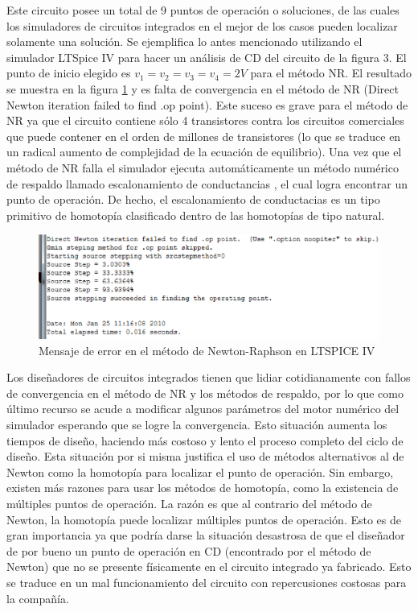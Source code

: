 \documentclass[conference,letterpaper,onecolumn]{IEEEtran}
\begin{document}
Este circuito posee un total de 9 puntos de operaci\'on o soluciones, de las cuales los simuladores de circuitos integrados en el mejor de los casos pueden localizar solamente una soluci\'on. Se ejemplifica lo antes mencionado utilizando el simulador LTSpice IV \cite{LTSpice} para hacer un an\'alisis de CD del circuito de la figura 3. El punto de inicio elegido es  $v_1=v_2=v_3=v_4=2V$  para el m\'etodo NR. El resultado se muestra en la figura \ref{newtonfail} y es falta de convergencia en el m\'etodo de NR  ({\sf Direct Newton iteration failed to find .op point}). Este suceso es grave para el m\'etodo de NR ya que el circuito contiene s\'olo 4 transistores contra los circuitos comerciales que puede contener en el orden de millones de transistores (lo que se traduce en un radical aumento de complejidad de la ecuaci\'on de equilibrio). Una vez que el m\'etodo de NR falla el simulador ejecuta autom\'aticamente un m\'etodo num\'erico de respaldo llamado escalonamiento de conductancias \cite{homo_spectre,homo_hspice,homo_aplac}, el cual logra encontrar un punto de operaci\'on. De hecho, el escalonamiento
de conductacias es un tipo primitivo de homotop{\'i}a clasificado dentro de las homotop{\'i}as de tipo natural. 


\begin{figure}[tbp]
\centering
\includegraphics[width=15cm]{figs/newtonfail.eps}
\caption{Mensaje de error en el m\'etodo de Newton-Raphson en LTSPICE IV}
\label{newtonfail}
\end{figure}

Los dise\~nadores de circuitos integrados tienen que lidiar cotidianamente con fallos de convergencia en el m\'etodo de NR y los m\'etodos de respaldo, por lo que como \'ultimo recurso se acude a modificar algunos par\'ametros del motor num\'erico del simulador esperando que se logre la convergencia. Esto situaci\'on aumenta los tiempos de dise\~no, haciendo m\'as costoso y lento el proceso completo del ciclo de dise\~no. Esta situaci\'on por si misma justifica el uso de m\'etodos alternativos al de Newton como la homotop{\'i}a para localizar el punto de operaci\'on. Sin embargo, existen m\'as razones para usar los m\'etodos de homotop{\'i}a, como la existencia de m\'ultiples puntos de operaci\'on. La raz\'on es que al contrario del m\'etodo de Newton, la homotop{\'i}a puede localizar m\'ultiples puntos de operaci\'on. Esto es de gran importancia ya que  podr{\'i}a darse la situaci\'on desastrosa de que el dise\~nador de por bueno un punto de operaci\'on en CD (encontrado por el m\'etodo de Newton) que no se presente f{\'i}sicamente en el circuito integrado ya fabricado. Esto se traduce en un mal funcionamiento del circuito con repercusiones costosas para la compa\~n{\'i}a.
\end{document}
